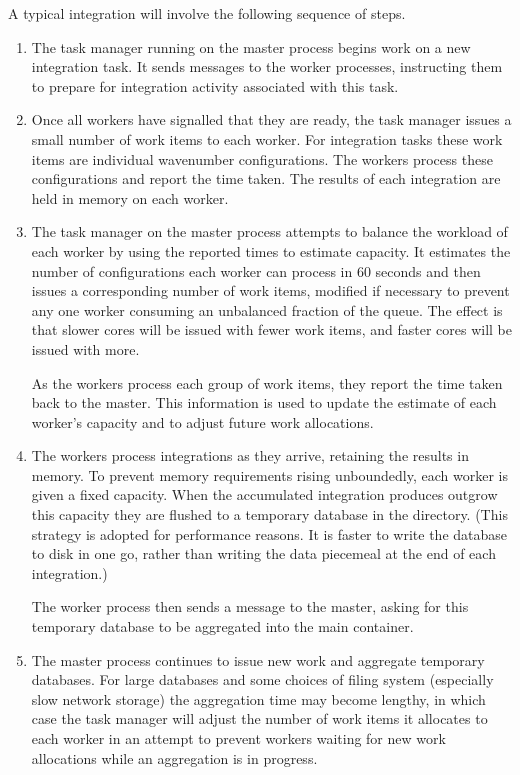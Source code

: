 \documentclass[11pt,a4paper]{article}
\renewcommand{\texttt}[1]{{\ttfamily\fontseries{l}\selectfont{#1}}}
\newcommand{\file}[1]{\texttt{{#1}}}
\begin{document}
A typical integration will involve the following sequence of steps.
\begin{enumerate}
    \item The task manager running on the master process begins work on a new
    integration task. It sends messages to the worker processes, instructing them
    to prepare for integration activity associated with this task.
    
    \item Once all workers have signalled that they are ready,
    the task manager issues a small number of work items to each worker.
    For integration tasks these work items are individual wavenumber
    configurations.
    The workers process these configurations and report the time taken.
    The results of each integration are held in memory on each worker.
    
    \item The task manager on the master process attempts to balance the workload
    of each worker by using the reported times to estimate capacity.
    It estimates the number of configurations each worker can process in 60 seconds
    and then issues a corresponding number of work items, modified if necessary to
    prevent any one worker consuming an unbalanced fraction of
    the queue.
    The effect is that slower cores will be issued with fewer work items,
    and faster cores will be issued with more.

    As the workers process each group of work items, they report the time taken
    back to the master. This information is used to update the estimate
    of each worker's capacity
    and to adjust future work allocations.
    
    \item The workers process integrations as they arrive, retaining the
    results in memory.
    To prevent memory requirements rising unboundedly, each worker
    is given a fixed capacity.
    When the accumulated integration produces outgrow this capacity
    they are flushed to a temporary database in the
    \file{tempfiles} directory.
    (This strategy is adopted for performance reasons. It is faster
    to write the database to disk in one go, rather than
    writing the data piecemeal at the end of each integration.)

    The worker process then sends a message to the master,
    asking for this temporary database to be aggregated into the main
    container.
    
    \item The master process continues to issue new work and aggregate
    temporary databases.
    For large databases and some choices of filing system
    (especially slow network storage)
    the aggregation time may become lengthy, in which case
    the task manager will adjust the number of work items
    it allocates to each worker in an attempt to prevent
    workers waiting for new work allocations while an aggregation is
    in progress.
    

\end{enumerate}
\end{document}
